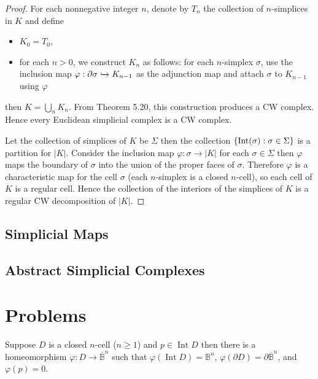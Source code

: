 \begin{proof}
	For each nonnegative integer \( n \), denote by \( T_{n} \) the collection of \( n \)-simplices in \( K \) and define
	\begin{itemize}[leftmargin=*,itemsep=0pt]
		\item \( K_{0} = T_{0} \),
		\item for each \( n > 0 \), we construct \( K_{n} \) as follows: for each \( n \)-simplex \( \sigma \), use the inclusion map \( \varphi: \partial \sigma \xhookrightarrow{} K_{n-1} \) as the adjunction map and attach \( \sigma \) to \( K_{n-1} \) using \( \varphi \)
	\end{itemize}

	then \( K = \bigcup_{n} K_{n} \). From Theorem 5.20, this construction produces a CW complex. Hence every Euclidean simplicial complex is a CW complex.

	Let the collection of simplices of \( K \) be \( \Sigma \) then the collection \( \left\{{ \operatorname{Int}(\sigma): \sigma \in \Sigma }\right\} \) is a partition for \( \left\vert K \right\vert \). Consider the inclusion map \( \varphi: \sigma \to \left\vert K \right\vert \) for each \( \sigma \in \Sigma \) then \( \varphi \) maps the boundary of \( \sigma \) into the union of the proper faces of \( \sigma \). Therefore \( \varphi \) is a characteristic map for the cell \( \sigma \) (each \( n \)-simplex is a closed \( n \)-cell), so each cell of \( K \) is a regular cell. Hence the collection of the interiors of the simplices of \( K \) is a regular CW decomposition of \( \left\vert K \right\vert \).
\end{proof}

\subsection*{Simplicial Maps}

\subsection*{Abstract Simplicial Complexes}

\section*{Problems}

\begin{note}\label{note:closed-cell-homeomorphism}
	Suppose \( D \) is a closed \( n \)-cell (\( n\geq 1 \)) and \( p\in \operatorname{Int} D \) then there is a homeomorphism \( \varphi: D \to \overline{\mathbb{B}}^{n} \) such that \( \varphi(\operatorname{Int} D) = \mathbb{B}^{n} \), \( \varphi(\partial D) = \partial \overline{\mathbb{B}}^{n} \), and \( \varphi(p) = 0 \).
\end{note}

